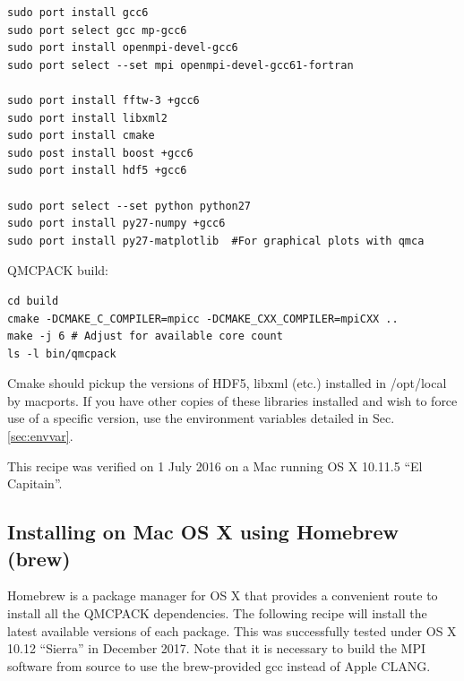 \verbatimfont{\footnotesize}
\begin{verbatim}
sudo port install gcc6
sudo port select gcc mp-gcc6
sudo port install openmpi-devel-gcc6
sudo port select --set mpi openmpi-devel-gcc61-fortran

sudo port install fftw-3 +gcc6
sudo port install libxml2
sudo port install cmake
sudo post install boost +gcc6
sudo port install hdf5 +gcc6

sudo port select --set python python27
sudo port install py27-numpy +gcc6
sudo port install py27-matplotlib  #For graphical plots with qmca
\end{verbatim}

QMCPACK build:
\verbatimfont{\footnotesize}
\begin{verbatim}
cd build
cmake -DCMAKE_C_COMPILER=mpicc -DCMAKE_CXX_COMPILER=mpiCXX ..
make -j 6 # Adjust for available core count
ls -l bin/qmcpack
\end{verbatim}

Cmake should pickup the versions of HDF5, libxml (etc.) installed in
/opt/local by macports. If you have other copies of these libraries
installed and wish to force use of a specific version, use the
environment variables detailed in Sec. \ref{sec:envvar}.

This recipe was verified on 1 July 2016 on a Mac running OS X 10.11.5
``El Capitain''.

\subsection{Installing on Mac OS X using Homebrew (brew)}
Homebrew is a package manager for OS X that provides a convenient
route to install all the QMCPACK dependencies. The
following recipe will install the latest available versions of each
package. This was successfully tested under OS X 10.12 ``Sierra'' in December 2017. Note that it is necessary to build the MPI software from
source to use the brew-provided gcc instead of Apple CLANG.

